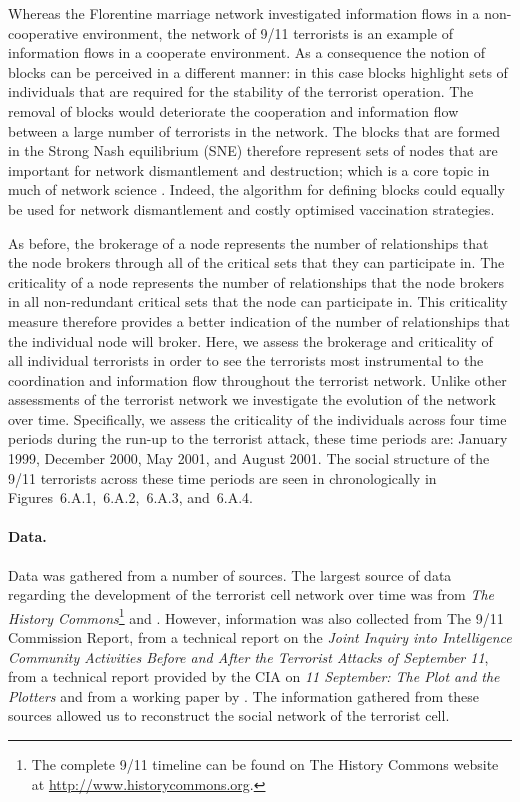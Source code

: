 Whereas the Florentine marriage network investigated information flows in a non-cooperative environment, the network of 9/11 terrorists is an example of information flows in a cooperate environment. As a consequence the notion of blocks can be perceived in a different manner: in this case blocks highlight sets of individuals that are required for the stability of the terrorist operation. The removal of blocks would deteriorate the cooperation and information flow between a large number of terrorists in the network. The blocks that are formed in the Strong Nash equilibrium (SNE) therefore represent sets of nodes that are important for network dismantlement and destruction; which is a core topic in much of network science \citep{Carley2002, Carley2006, KovacsBarabasi2015, MoroneMaske2015}. Indeed, the algorithm for defining blocks could equally be used for network dismantlement and costly optimised vaccination strategies.

As before, the brokerage of a node represents the number of relationships that the node brokers through all of the critical sets that they can participate in. The criticality of a node represents the number of relationships that the node brokers in all non-redundant critical sets that the node can participate in. This criticality measure therefore provides a better indication of the number of relationships that the individual node will broker. Here, we assess the brokerage and criticality of all individual terrorists in order to see the terrorists most instrumental to the coordination and information flow throughout the terrorist network. Unlike other assessments of the terrorist network \citep{Krebs2002, Farley2003, Lindelauf2013, Flores2014} we investigate the evolution of the network over time. Specifically, we assess the criticality of the individuals across four time periods during the run-up to the terrorist attack, these time periods are: January 1999, December 2000, May 2001, and August 2001. The social structure of the 9/11 terrorists across these time periods are seen in chronologically in Figures~6.A.1,~6.A.2,~6.A.3, and~6.A.4.

\paragraph{Data.}

Data was gathered from a number of sources. The largest source of data regarding the development of the terrorist cell network over time was from \emph{The History Commons}\footnote{The complete 9/11 timeline can be found on The History Commons website at \href{http://www.historycommons.org}{http://www.historycommons.org}.} and \citet{Thompson2004}. However, information was also collected from The 9/11 Commission Report, from a technical report on the \emph{Joint Inquiry into Intelligence Community Activities Before and After the Terrorist Attacks of September 11}, from a technical report provided by the CIA on \emph{11 September: The Plot and the Plotters} and from a working paper by \citet{MassonWilkins2013}. The information gathered from these sources allowed us to reconstruct the social network of the terrorist cell.

